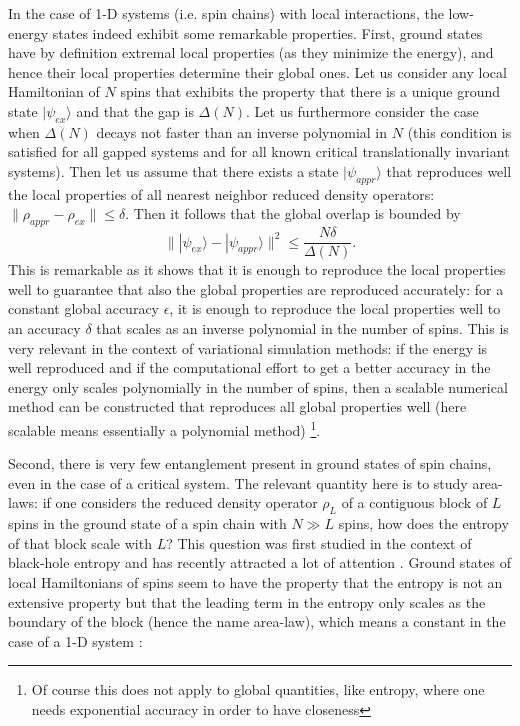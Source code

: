 \documentclass[aps,prl,epsfig,graphics,floatfix,mathbbm,a4paper]{article}
\newcommand{\1}{\mathbbm{1}}
\renewcommand{\>}{\rangle}
\newcommand{\<}{\langle}
\begin{document}
In the case of 1-D systems (i.e. spin chains) with local
interactions, the low-energy states indeed exhibit some remarkable
properties. First, ground states have by definition extremal local
properties (as they minimize the energy), and hence their local
properties determine their global ones. Let us consider any local
Hamiltonian of $N$ spins that exhibits the property that there is
a unique ground state $|\psi_{ex}\rangle$ and that the  gap is
$\Delta(N)$. Let us furthermore consider the case when $\Delta(N)$
decays not faster than an inverse polynomial in $N$ (this
condition is satisfied for all gapped systems and for all known
critical translationally invariant systems). Then let us assume
that there exists a state $|\psi_{appr}\rangle$ that reproduces
well the local properties of all nearest neighbor reduced density
operators: $\|\rho_{appr}-\rho_{ex}\|\leq \delta$. Then it follows
that the global overlap is bounded by
\[\||\psi_{ex}\rangle-|\psi_{appr}\rangle\|^2\leq \frac{N\delta}{\Delta(N)}.\] This is remarkable as it shows that it is enough to
reproduce the local properties well to guarantee that also the
global properties are reproduced accurately: for a constant global
accuracy $\epsilon$, it is enough to reproduce the local
properties well to an accuracy $\delta$ that scales as an inverse
polynomial in the number of spins. This is very relevant in the
context of variational simulation methods: if the energy is well
reproduced and if the computational effort to get a better
accuracy in the energy only scales polynomially in the number of
spins, then a scalable numerical method can be constructed that
reproduces all global properties well (here scalable means
essentially a polynomial method) \footnote{Of course this does not
    apply to global quantities, like entropy, where one needs
    exponential accuracy in order to have closeness}.

Second, there is very few entanglement present in ground states of
spin chains, even in the case of a critical system. The relevant
quantity here is to study area-laws: if one considers the reduced
density operator $\rho_L$ of a contiguous block of $L$ spins in
the ground state of a spin chain with $N\gg L$ spins, how does the
entropy of that block scale with $L$? This question was first
studied in the context of black-hole entropy
\cite{Bombelli-Srednicki-Bousso} and has recently attracted a lot
of attention \cite{arealaw, Ortiz, Cardy}. Ground states of local
Hamiltonians of spins seem to have the property that the entropy
is not an extensive property but that the leading term in the
entropy only scales as the boundary of the block (hence the name
area-law), which means a constant in the case of a 1-D system
\cite{Cardy, Jin}:
\end{document}
